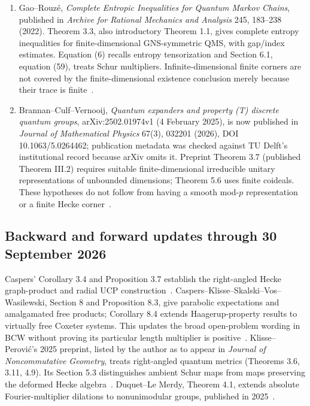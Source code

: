\documentclass[11pt]{article}
\theoremstyle{remark}\newtheorem{remark}[definition]{Remark}
\begin{document}
\begin{enumerate}
{transforms on Coxeter groups and strong solidity}, arXiv:2109.00588v3
(10 September 2024), published in \emph{Groups, Geometry, and Dynamics}
18(2), 501--549 (2024). The revision repairs Lemmas 3.5--3.6.
Section 8.1 fixes the normalized Hecke convention. Assumption 8.1
(published p.~543) \emph{assumes} UCP extension of the diagonal multipliers;
Problem 9.1 (p.~546) asks about its generality for word length, within a
broader Haagerup/CBAP question. Our counterexample concerns the specific
length multiplier, not that broader existence problem~\cite{BorstCaspersWasilewski2024}.
\item Gao--Rouz\'e, \emph{Complete Entropic Inequalities for Quantum Markov
Chains}, published in \emph{Archive for Rational Mechanics and Analysis}
245, 183--238 (2022). Theorem 3.3, also introductory Theorem 1.1, gives
complete entropy inequalities for finite-dimensional GNS-symmetric QMS,
with gap/index estimates. Equation (6) recalls entropy tensorization and
Section 6.1, equation (59), treats Schur multipliers. Infinite-dimensional
finite corners are not covered by the finite-dimensional existence conclusion
merely because their trace is finite~\cite{GaoRouze2022}.
\item Brannan--Culf--Vernooij, \emph{Quantum expanders and property (T) discrete
quantum groups}, arXiv:2502.01974v1 (4 February 2025), is now published in
\emph{Journal of Mathematical Physics} 67(3), 032201 (2026), DOI
10.1063/5.0264462; publication metadata was checked against TU Delft's
institutional record because arXiv omits it. Preprint Theorem 3.7
(published Theorem III.2) requires suitable finite-dimensional irreducible
unitary representations of unbounded dimensions; Theorem 5.6 uses finite
coideals. These hypotheses do not follow from having a smooth mod-$p$
representation or a finite Hecke corner~\cite{BrannanCulfVernooij2026}.
\end{enumerate}

\subsection{Backward and forward updates through 30 September 2026}
Caspers' Corollary 3.4 and Proposition 3.7 establish the right-angled
Hecke graph-product and radial UCP construction~\cite{Caspers2020}.
Caspers--Klisse--Skalski--Vos--Wasilewski, Section 8 and Proposition 8.3,
give parabolic expectations and amalgamated free products; Corollary 8.4
extends Haagerup-property results to virtually free Coxeter systems.
This updates the broad open-problem wording in BCW without proving its
particular length multiplier is positive~\cite{CaspersEtAl2023}.
Klisse--Perovi\'c's 2025 preprint, listed by the author as to appear in
\emph{Journal of Noncommutative Geometry}, treats right-angled quantum metrics
(Theorems 3.6, 3.11, 4.9). Its Section 5.3 distinguishes ambient Schur maps
from maps preserving the deformed Hecke algebra~\cite{KlissePerovic2025}.
Duquet--Le Merdy, Theorem 4.1, extends absolute Fourier-multiplier dilations
to nonunimodular groups, published in 2025~\cite{DuquetLeMerdy2025}.
\end{document}
